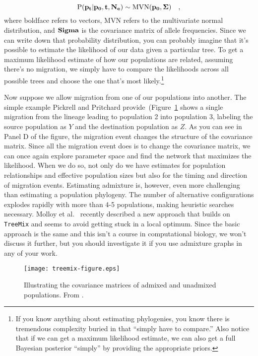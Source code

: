\[
  \mbox{P}(\bf p_t|\bf p_0, \bf t, \bf N_e) \sim \mbox{MVN}(\bf p_0,
  \bf \Sigma) \quad ,
\]
where boldface refers to vectors, MVN refers to the multivariate
normal distribution, and $\bf Sigma$ is the covariance matrix of
allele frequencies. Since we can write down that probability
distribution, you can probably imagine that it's possible to estimate
the likelihood of our data given a particular tree. To get a maximum
likelihood estimate of how our populations are related, assuming
there's no migration, we simply have to compare the likelihoods across
all possible trees and choose the one that's most likely.\footnote{If
  you know anything about estimating phylogenies, you know there is
  tremendous complexity buried in that ``simply have to compare.''
  Also notice that if we can get a maximum likelihood estimate, we can
  also get a full Bayesian posterior ``simply'' by providing the
  appropriate priors.}

Now suppose we allow migration from one of our populations into
another. The simple example Pickrell and Pritchard
provide~(Figure~\ref{fig:treemix-figure} shows a single migration from
the lineage leading to population 2 into population 3, labeling the
source population as $Y$ and the destination population as $Z$. As you
can see in Panel D of the figure, the migration event changes the
structure of the covariance matrix. Since all the migration event does
is to change the covariance matrix, we can once again explore
parameter space and find the network that maximizes the
likelihood. When we do so, not only do we have estimates for
population relationships and effective population sizes but also for
the timing and direction of migration events. Estimating admixture is,
however, even more challenging than estimating a population
phylogeny. The number of alternative configurations explodes rapidly
with more than 4-5 populations, making heuristic searches
necessary. Molloy et al.~\cite{Molloy-etal-2021} recently described a
new approach that builds on {\tt TreeMix} and seems to avoid getting
stuck in a local optimum. Since the basic approach is the same and
this isn't a course in computational biology, we won't discuss it
further, but you should investigate it if you use admixture graphs in
any of your work.

\begin{figure}
  \begin{center}
    \texttt{[image: treemix-figure.eps]}
  \end{center}
  \caption{Illustrating the covariance matrices of admixed and
    unadmixed populations. From \cite{Pickrell-Pritchard-2012}.}\label{fig:treemix-figure}
\end{figure}


